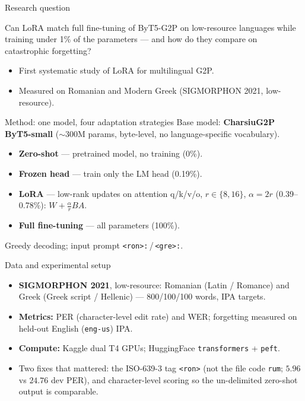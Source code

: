 \documentclass[aspectratio=169]{beamer}
\begin{document}
\begin{frame}{Research question}
  \begin{block}{}
    \centering\large
    Can \alert{LoRA} match \alert{full fine-tuning} of ByT5-G2P on low-resource languages while training \alert{under 1\%} of the parameters --- and how do they compare on \alert{catastrophic forgetting}?
  \end{block}
  \vspace{1em}
  \begin{itemize}
    \item First systematic study of LoRA for multilingual G2P.
    \item Measured on Romanian and Modern Greek (SIGMORPHON 2021, low-resource).
  \end{itemize}
\end{frame}

\begin{frame}{Method: one model, four adaptation strategies}
  Base model: \textbf{CharsiuG2P ByT5-small} ($\sim$300M params, byte-level, no language-specific vocabulary).
  \vspace{0.5em}
  \begin{itemize}
    \item \textbf{Zero-shot} --- pretrained model, no training (0\%).
    \item \textbf{Frozen head} --- train only the LM head (0.19\%).
    \item \textbf{LoRA} --- low-rank updates on attention q/k/v/o, $r\in\{8,16\}$, $\alpha{=}2r$ (0.39--0.78\%): $W + \tfrac{\alpha}{r}BA$.
    \item \textbf{Full fine-tuning} --- all parameters (100\%).
  \end{itemize}
  \vspace{0.3em}
  Greedy decoding; input prompt \texttt{<ron>:}\,/\,\texttt{<gre>:}.
\end{frame}

\begin{frame}{Data and experimental setup}
  \begin{itemize}
    \item \textbf{SIGMORPHON 2021}, low-resource: Romanian (Latin / Romance) and Greek (Greek script / Hellenic) --- 800/100/100 words, IPA targets.
    \item \textbf{Metrics:} PER (character-level edit rate) and WER; \alert{forgetting} measured on held-out English (\texttt{eng-us}) IPA.
    \item \textbf{Compute:} Kaggle dual T4 GPUs; HuggingFace \texttt{transformers} + \texttt{peft}.
    \item Two fixes that mattered: the ISO-639-3 tag \texttt{<ron>} (not the file code \texttt{rum}; $5.96$ vs $24.76$ dev PER), and character-level scoring so the un-delimited zero-shot output is comparable.
  \end{itemize}
\end{frame}
\end{document}

